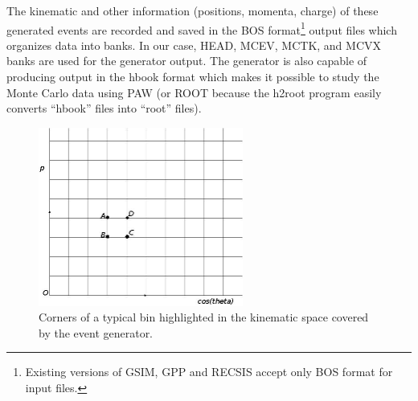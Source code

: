 
The kinematic and other information (positions, momenta, charge) of these generated %
events %
are recorded and saved in the BOS format\footnote{Existing versions of GSIM, GPP and RECSIS accept only BOS format for input files.} output files which organizes data into banks. In our case, HEAD, MCEV, MCTK, and MCVX banks are used for the generator output. The generator is also capable of producing output in the hbook format which makes it possible to study the Monte Carlo data using PAW (or ROOT because the h2root program easily converts ``hbook'' files into ``root'' files).

\begin{figure}[htpb] %
\centering
  \leavevmode \includegraphics[width=0.6\textwidth]{figuresEG4/FigSim/kineGrid_steg.png} 
  \caption[A section of the kinematics grid]{Corners of a typical bin highlighted in the kinematic space covered by the event generator.}
  \label{CSgrid}  %
\end{figure}

